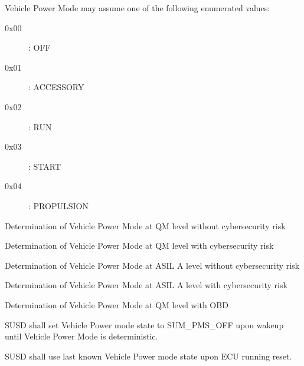 {Vehicle Power Mode may assume one of the following enumerated values:
\begin{description}
\item[0x00]: OFF
\item[0x01]: ACCESSORY
\item[0x02]: RUN
\item[0x03]: START
\item[0x04]: PROPULSION
\end{description}
}
{             }

{Determination of Vehicle Power Mode at QM level without cybersecurity risk
}
{        }


{Determination of Vehicle Power Mode at QM level with cybersecurity risk
}
{   }

{Determination of Vehicle Power Mode at ASIL A level without cybersecurity risk
}
{   }

{Determination of Vehicle Power Mode at ASIL A level with cybersecurity risk
}
{   }

{Determination of Vehicle Power Mode at QM level with OBD
}
{ }

{SUSD shall set Vehicle Power mode state to SUM_PMS_OFF upon wakeup until Vehicle Power Mode is deterministic.}
{}

{SUSD shall use last known Vehicle Power mode state upon ECU running reset.}
{}

